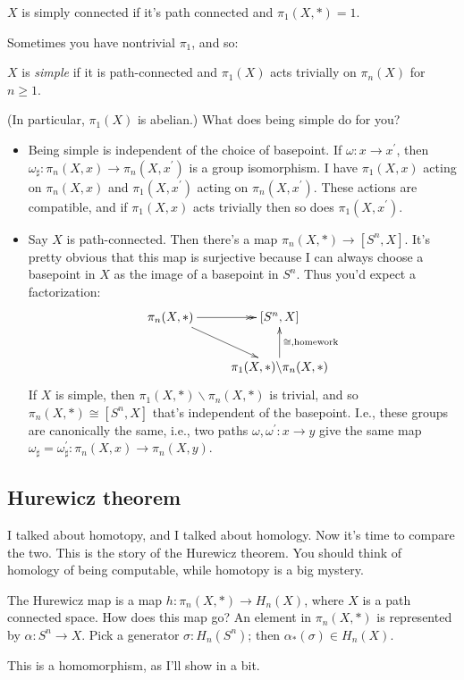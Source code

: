 \begin{definition}
    $X$ is simply connected if it's path connected and $\pi_1(X,\ast) = 1$.
\end{definition}
Sometimes you have nontrivial $\pi_1$, and so:
\begin{definition}
    $X$ is \emph{simple} if it is path-connected and $\pi_1(X)$ acts trivially on $\pi_n(X)$ for $n\geq 1$.
\end{definition}
(In particular, $\pi_1(X)$ is abelian.) What does being simple do for you?
\begin{itemize}
    \item Being simple is independent of the choice of basepoint. If $\omega:x\to x^\prime$, then $\omega_\sharp:\pi_n(X,x)\to \pi_n(X,x^\prime)$ is a group isomorphism. I have $\pi_1(X,x)$ acting on $\pi_n(X,x)$ and $\pi_1(X,x^\prime)$ acting on $\pi_n(X,x^\prime)$. These actions are compatible, and if $\pi_1(X,x)$ acts trivially then so does $\pi_1(X,x^\prime)$.
    \item Say $X$ is path-connected. Then there's a map $\pi_n(X,\ast)\to [S^n,X]$. It's pretty obvious that this map is surjective because I can always choose a basepoint in $X$ as the image of a basepoint in $S^n$. Thus you'd expect a factorization:
	\begin{equation*}
	    \xymatrix{
		\pi_n(X,\ast)\ar@{->>}[r]\ar[dr] & [S^n,X]\\
		& \pi_1(X,\ast)\backslash \pi_n(X,\ast)\ar[u]_{\cong,\text{homework}}
		}
	\end{equation*}
	If $X$ is simple, then $\pi_1(X,\ast)\backslash \pi_n(X,\ast)$ is trivial, and so $\pi_n(X,\ast)\cong [S^n,X]$ that's independent of the basepoint. I.e., these groups are canonically the same, i.e., two paths $\omega,\omega^\prime:x\to y$ give the same map $\omega_\sharp = \omega^\prime_\sharp:\pi_n(X,x)\to \pi_n(X,y)$.
\end{itemize}
\subsection{Hurewicz theorem}
I talked about homotopy, and I talked about homology. Now it's time to compare the two. This is the story of the Hurewicz theorem. You should think of homology of being computable, while homotopy is a big mystery.
\begin{definition}
The Hurewicz map is a map $h:\pi_n(X,\ast)\to H_n(X)$, where $X$ is a path connected space. How does this map go? An element in $\pi_n(X,\ast)$ is represented by $\alpha:S^n\to X$. Pick a generator $\sigma:H_n(S^n)$; then $\alpha_\ast(\sigma)\in H_n(X)$.
\end{definition}
This is a homomorphism, as I'll show in a bit.

